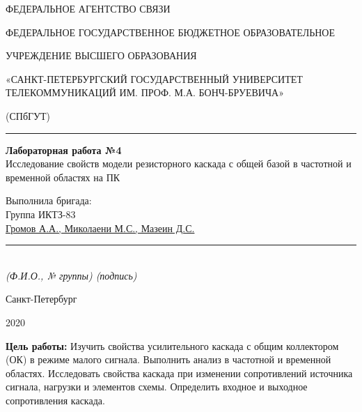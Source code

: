 \documentclass[a4paper,14pt]{extarticle}
\begin{document}
    \begin{center}
        \thispagestyle{empty}
        \begin{singlespace}
        ФЕДЕРАЛЬНОЕ АГЕНТСТВО СВЯЗИ

        ФЕДЕРАЛЬНОЕ ГОСУДАРСТВЕННОЕ БЮДЖЕТНОЕ ОБРАЗОВАТЕЛЬНОЕ

        УЧРЕЖДЕНИЕ ВЫСШЕГО ОБРАЗОВАНИЯ

        «САНКТ-ПЕТЕРБУРГСКИЙ ГОСУДАРСТВЕННЫЙ УНИВЕРСИТЕТ ТЕЛЕКОММУНИКАЦИЙ ИМ. ПРОФ. М.А. БОНЧ-БРУЕВИЧА»

        (СПбГУТ)
        \end{singlespace}
        \vspace{-1ex}
        \rule{\textwidth}{0.4pt}
        \vspace{-5ex}

        \vspace{100px}
        \textbf{Лабораторная работа №4}\\
        Исследование свойств модели резисторного каскада с общей базой в частотной и временной областях на ПК

    \vspace{100px}
    \end{center}
    \vspace{4ex}
    \begin{flushright}
    \parbox{12 cm}{
    \begin{flushleft}
        Выполнила бригада:\\
        Группа ИКТЗ-83\\
        \underline{Громов А.А., Миколаени М.С., Мазеин Д.С.} \hfill \rule[-0.85ex]{0.09\textwidth}{0.6pt}\\
        \vspace{-1ex}
        \footnotesize \textit{ (Ф.И.О., № группы) \hfill (подпись)} \normalsize


    \end{flushleft}
    }
    \end{flushright}
    \begin{center}
        \vfill
        Санкт-Петербург

        2020

    \end{center}
    \newpage

    \textbf{Цель работы:} Изучить свойства усилительного каскада с общим коллектором (ОК) в режиме малого сигнала. Выполнить анализ в частотной и временной областях. Исследовать свойства каскада при изменении сопротивлений источника сигнала, нагрузки и элементов схемы. Определить входное и выходное сопротивления каскада.
\end{document}
